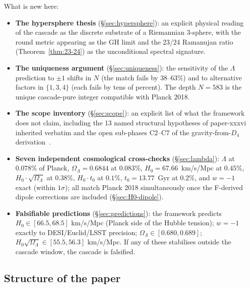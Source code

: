 \documentclass[11pt]{article}
\theoremstyle{plain}
\theoremstyle{definition}
\theoremstyle{remark}
\begin{document}
What is new here:
\begin{itemize}[leftmargin=2em]
\item \textbf{The hypersphere thesis} (\S\ref{sec:hypersphere}): an explicit physical reading of the cascade as the discrete substrate of a Riemannian 3-sphere, with the round metric appearing as the GH limit and the 23/24 Ramanujan ratio (Theorem~\ref{thm:23-24}) as the unconditional spectral signature.
\item \textbf{The uniqueness argument} (\S\ref{sec:uniqueness}): the sensitivity of the $\Lambda$ prediction to $\pm 1$ shifts in $N$ (the match fails by 38--63\%) and to alternative factors in $\{1, 3, 4\}$ (each fails by tens of percent). The depth $N = 583$ is the unique cascade-pure integer compatible with Planck 2018.
\item \textbf{The scope inventory} (\S\ref{sec:scope}): an explicit list of what the framework does not claim, including the 13 named structural hypotheses of paper-xxxvi inherited verbatim and the open sub-phases C2--C7 of the gravity-from-$D_4$ derivation~\citep{cascadeGR}.
\item \textbf{Seven independent cosmological cross-checks} (\S\ref{sec:lambda}): $\Lambda$ at $0.078\%$ of Planck, $\Omega_\Lambda = 0.6844$ at $0.083\%$, $H_0 = 67.66$~km/s/Mpc at $0.45\%$, $H_0 \cdot \sqrt{\Omega_\Lambda}$ at $0.38\%$, $H_0 \cdot t_0$ at $0.1\%$, $t_0 = 13.77$~Gyr at $0.2\%$, and $w = -1$ exact (within $1\sigma$); all match Planck 2018 simultaneously once the F-derived dipole corrections are included (\S\ref{sec:H0-dipole}).
\item \textbf{Falsifiable predictions} (\S\ref{sec:predictions}): the framework predicts $H_0 \in [66.5, 68.5]$ km/s/Mpc (Planck side of the Hubble tension); $w = -1$ exactly to DESI/Euclid/LSST precision; $\Omega_\Lambda \in [0.680, 0.689]$; $H_0\sqrt{\Omega_\Lambda} \in [55.5, 56.3]$ km/s/Mpc. If any of these stabilises outside the cascade window, the cascade is falsified.
\end{itemize}

\subsection{Structure of the paper}
\end{document}
